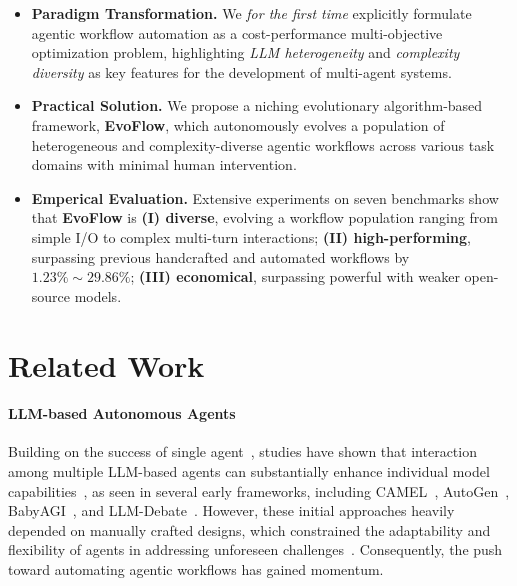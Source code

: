 \documentclass{article}
\theoremstyle{plain}
\theoremstyle{definition}
\theoremstyle{remark}
\newcommand{\ourmethod}{{\fontfamily{lmtt}\selectfont \textbf{EvoFlow}}\xspace}
\newcommand{\llmname}[1]{{\fontfamily{pcr}\selectfont {#1}}\xspace}
\begin{document}
\vspace{-1.em}
\begin{itemize}[leftmargin=*,itemsep=-0.1em]
\item \textbf{Paradigm Transformation.} We \textit{for the first time} explicitly formulate agentic workflow automation as a cost-performance multi-objective optimization problem, highlighting \textit{LLM heterogeneity} and \textit{complexity diversity} as key features for the development of multi-agent systems.
\item \textbf{Practical Solution.} We propose a niching evolutionary algorithm-based framework, \ourmethod, which autonomously evolves a population of heterogeneous and complexity-diverse agentic workflows across various task domains with minimal human intervention.  
    \item \textbf{Emperical Evaluation.} Extensive experiments on seven benchmarks show that \ourmethod is \textbf{(I) diverse}, evolving a workflow population ranging from simple I/O to complex multi-turn interactions; \textbf{(II) high-performing}, surpassing previous handcrafted and automated workflows by $1.23\%\sim29.86\%$; \textbf{(III) economical}, surpassing powerful \llmname{o1-preview} with weaker open-source models.
\end{itemize}
\vspace{-0.5em}


\vspace{-0.5em}
\section{Related Work}
\vspace{-0.5em}
\paragraph{LLM-based Autonomous Agents}


Building on the success of single agent~\citep{shen2024hugginggpt,zhu2024knowagent,zhong2024memorybank}, studies have shown that interaction among multiple LLM-based agents can substantially enhance individual model capabilities~\citep{FCS2024_Survey-Agent}, as seen in several early frameworks, including CAMEL~\citep{NeurIPS2023camel}, AutoGen~\citep{autogen}, BabyAGI~\citep{babyagi}, and LLM-Debate~\citep{arXiv2023_MultiAgent-Debate}. However, these initial approaches heavily depended on manually crafted designs, which constrained the adaptability and flexibility of agents in addressing unforeseen challenges~\citep{he2023lego,chen2023agentverse}. Consequently, the push toward automating agentic workflows has gained momentum.
\end{document}
